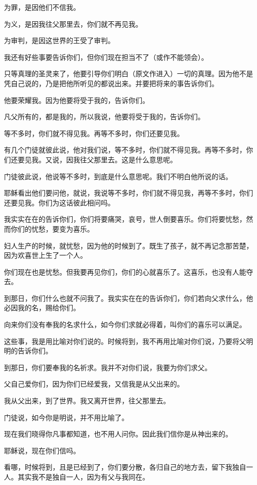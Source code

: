 \documentclass[12pt,oneside]{book}
\begin{document}
为罪，是因他们不信我。

为义，是因我往父那里去，你们就不再见我。

为审判，是因这世界的王受了审判。

我还有好些事要告诉你们，但你们现在担当不了（或作不能领会）。

只等真理的圣灵来了，他要引导你们明白（原文作进入）一切的真理。因为他不是凭自己说的，乃是把他所听见的都说出来。并要把将来的事告诉你们。

他要荣耀我。因为他要将受于我的，告诉你们。

凡父所有的，都是我的，所以我说，他要将受于我的，告诉你们。

等不多时，你们就不得见我。再等不多时，你们还要见我。

有几个门徒就彼此说，他对我们说，等不多时，你们就不得见我。再等不多时，你们还要见我。又说，因我往父那里去。这是什么意思呢。

门徒彼此说，他说等不多时，到底是什么意思呢。我们不明白他所说的话。

耶稣看出他们要问他，就说，我说等不多时，你们就不得见我，再等不多时，你们还要见我。你们为这话彼此相问吗。

我实实在在的告诉你们，你们将要痛哭，哀号，世人倒要喜乐。你们将要忧愁，然而你们的忧愁，要变为喜乐。

妇人生产的时候，就忧愁，因为他的时候到了。既生了孩子，就不再记念那苦楚，因为欢喜世上生了一个人。

你们现在也是忧愁。但我要再见你们，你们的心就喜乐了。这喜乐，也没有人能夺去。

到那日，你们什么也就不问我了。我实实在在的告诉你们，你们若向父求什么，他必因我的名，赐给你们。

向来你们没有奉我的名求什么，如今你们求就必得着，叫你们的喜乐可以满足。

这些事，我是用比喻对你们说的。时候将到，我不再用比喻对你们说，乃要将父明明的告诉你们。

到那日，你们要奉我的名祈求。我并不对你们说，我要为你们求父。

父自己爱你们，因为你们已经爱我，又信我是从父出来的。

我从父出来，到了世界。我又离开世界，往父那里去。

门徒说，如今你是明说，并不用比喻了。

现在我们晓得你凡事都知道，也不用人问你。因此我们信你是从神出来的。

耶稣说，现在你们信吗。

看哪，时候将到，且是已经到了，你们要分散，各归自己的地方去，留下我独自一人。其实我不是独自一人，因为有父与我同在。
\end{document}
